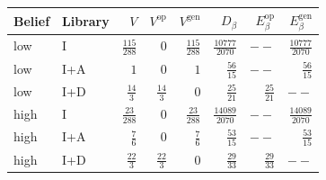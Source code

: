 \begin{tabular}{llrrrrrr}
\toprule
Belief & Library & $V$ & $V^{\mathrm{op}}$ & $V^{\mathrm{gen}}$ & $D_\beta$ & $E^{\mathrm{op}}_\beta$ & $E^{\mathrm{gen}}_\beta$ \\
\midrule
low & I & $\frac{115}{288}$ & $0$ & $\frac{115}{288}$ & $\frac{10777}{2070}$ & $--$ & $\frac{10777}{2070}$ \\
low & I+A & $1$ & $0$ & $1$ & $\frac{56}{15}$ & $--$ & $\frac{56}{15}$ \\
low & I+D & $\frac{14}{3}$ & $\frac{14}{3}$ & $0$ & $\frac{25}{21}$ & $\frac{25}{21}$ & $--$ \\
high & I & $\frac{23}{288}$ & $0$ & $\frac{23}{288}$ & $\frac{14089}{2070}$ & $--$ & $\frac{14089}{2070}$ \\
high & I+A & $\frac{7}{6}$ & $0$ & $\frac{7}{6}$ & $\frac{53}{15}$ & $--$ & $\frac{53}{15}$ \\
high & I+D & $\frac{22}{3}$ & $\frac{22}{3}$ & $0$ & $\frac{29}{33}$ & $\frac{29}{33}$ & $--$ \\
\bottomrule
\end{tabular}
